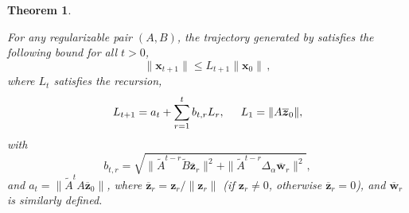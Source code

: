 \documentclass[journal]{IEEEtran}
\newtheorem{theorem}{Theorem}
\theoremstyle{definition}
\theoremstyle{remark}
\newcommand\x{{\bm x}}
\newcommand\z{{\bm z}}
\newcommand\w{{\bm w}}
\begin{document}
	\begin{theorem}
    \label{thm:recursion}
	 
        For any regularizable pair $(A,B)$, the trajectory generated by  satisfies the following bound for all $t>0$,
		\begin{equation*}
		\|\x_{t+1}\| \leq L_{t+1} \|\x_0\| \,,
		\end{equation*}
		where $L_t$ satisfies the recursion,
		\[ L_{t+1} = a_t + \sum_{r=1}^{t} b_{t,r} L_r, \hspace{5mm} L_1 = \|A \overline{\z}_0\|, \]
		with $$b_{t,r} =\sqrt{ \|\widetilde{A}^{t-r}\widetilde{B}\overline{\z}_r\|^2 + \|\widetilde{A}^{t-r}\Delta_\alpha \overline{\w}_r\|^2},$$ and $a_t = \|\widetilde{A}^t A \overline{\z}_0\|$, 
		where $\overline{\z}_r = \z_r / \|\z_r\|$ (if $\z_r \neq 0$, otherwise $\overline{\z}_r = 0$), and $\overline{\w}_r$ is similarly defined.
	\end{theorem}{}
    
\end{document}
